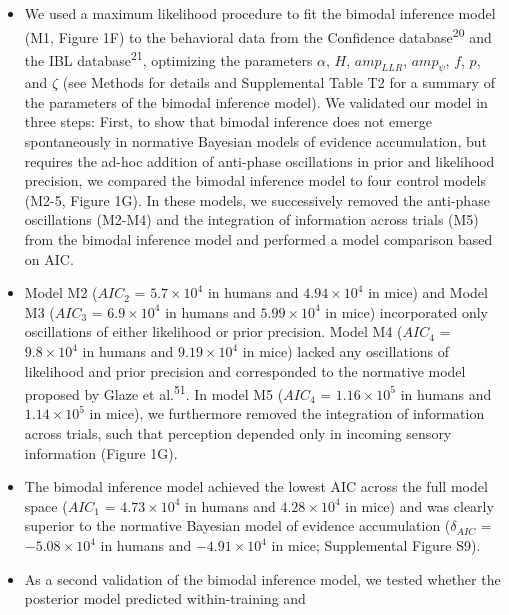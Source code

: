\documentclass[
]{article}
\begin{document}
\begin{itemize}
\item
  We used a maximum likelihood procedure to fit the bimodal inference
  model (M1, Figure 1F) to the behavioral data from the Confidence
  database\textsuperscript{20} and the IBL database\textsuperscript{21},
  optimizing the parameters \(\alpha\), \(H\), \(amp_{LLR}\),
  \(amp_{\psi}\), \(f\), \(p\), and \(\zeta\) (see Methods for details
  and Supplemental Table T2 for a summary of the parameters of the
  bimodal inference model). We validated our model in three steps:
  First, to show that bimodal inference does not emerge spontaneously in
  normative Bayesian models of evidence accumulation, but requires the
  ad-hoc addition of anti-phase oscillations in prior and likelihood
  precision, we compared the bimodal inference model to four control
  models (M2-5, Figure 1G). In these models, we successively removed the
  anti-phase oscillations (M2-M4) and the integration of information
  across trials (M5) from the bimodal inference model and performed a
  model comparison based on AIC.
\item
  Model M2 (\(AIC_2\) = \(\ensuremath{5.7\times 10^{4}}\) in humans and
  \(\ensuremath{4.94\times 10^{4}}\) in mice) and Model M3 (\(AIC_3\) =
  \(\ensuremath{6.9\times 10^{4}}\) in humans and
  \(\ensuremath{5.99\times 10^{4}}\) in mice) incorporated only
  oscillations of either likelihood or prior precision. Model M4
  (\(AIC_4\) = \(\ensuremath{9.8\times 10^{4}}\) in humans and
  \(\ensuremath{9.19\times 10^{4}}\) in mice) lacked any oscillations of
  likelihood and prior precision and corresponded to the normative model
  proposed by Glaze et al.\textsuperscript{51}. In model M5 (\(AIC_4\) =
  \(\ensuremath{1.16\times 10^{5}}\) in humans and
  \(\ensuremath{1.14\times 10^{5}}\) in mice), we furthermore removed
  the integration of information across trials, such that perception
  depended only in incoming sensory information (Figure 1G).
\item
  The bimodal inference model achieved the lowest AIC across the full
  model space (\(AIC_1\) = \(\ensuremath{4.73\times 10^{4}}\) in humans
  and \(\ensuremath{4.28\times 10^{4}}\) in mice) and was clearly
  superior to the normative Bayesian model of evidence accumulation
  (\(\delta_{AIC}\) = \(\ensuremath{-5.08\times 10^{4}}\) in humans and
  \(\ensuremath{-4.91\times 10^{4}}\) in mice; Supplemental Figure S9).
\item
  As a second validation of the bimodal inference model, we tested
  whether the posterior model predicted within-training and

\end{itemize}
\end{document}

